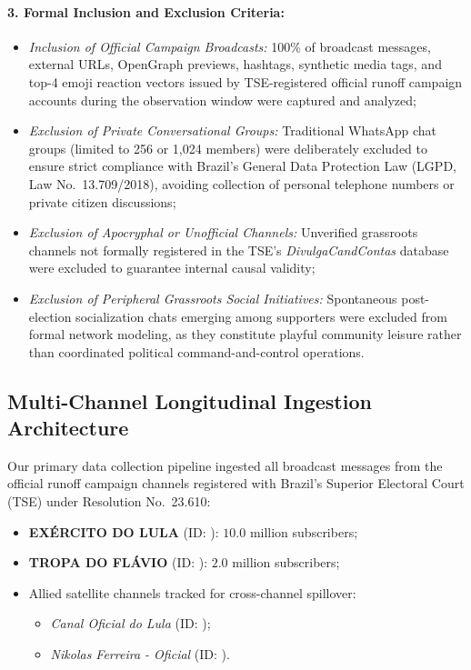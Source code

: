 \documentclass[preprint,12pt]{elsarticle}
\begin{document}
\paragraph{3. Formal Inclusion and Exclusion Criteria:}
\begin{itemize}
    \item \textit{Inclusion of Official Campaign Broadcasts:} 100\% of broadcast messages, external URLs, OpenGraph previews, hashtags, synthetic media tags, and top-4 emoji reaction vectors issued by TSE-registered official runoff campaign accounts during the observation window were captured and analyzed;
    \item \textit{Exclusion of Private Conversational Groups:} Traditional WhatsApp chat groups (limited to 256 or 1,024 members) were deliberately excluded to ensure strict compliance with Brazil's General Data Protection Law (LGPD, Law No.\ 13.709/2018), avoiding collection of personal telephone numbers or private citizen discussions;
    \item \textit{Exclusion of Apocryphal or Unofficial Channels:} Unverified grassroots channels not formally registered in the TSE's \textit{DivulgaCandContas} database were excluded to guarantee internal causal validity;
    \item \textit{Exclusion of Peripheral Grassroots Social Initiatives:} Spontaneous post-election socialization chats emerging among supporters were excluded from formal network modeling, as they constitute playful community leisure rather than coordinated political command-and-control operations.
\end{itemize}

\subsection{Multi-Channel Longitudinal Ingestion Architecture}
Our primary data collection pipeline ingested all broadcast messages from the official runoff campaign channels registered with Brazil's Superior Electoral Court (TSE) under Resolution No.\ 23.610:
\begin{itemize}
    \item \textbf{EXÉRCITO DO LULA} (ID: ): $10.0\text{ million}$ subscribers;
    \item \textbf{TROPA DO FLÁVIO} (ID: ): $2.0\text{ million}$ subscribers;
    \item Allied satellite channels tracked for cross-channel spillover:
    \begin{itemize}
        \item \textit{Canal Oficial do Lula} (ID: );
        \item \textit{Nikolas Ferreira - Oficial} (ID: ).
    \end{itemize}
\end{itemize}
\end{document}
